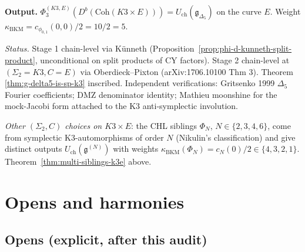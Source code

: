 \documentclass[11pt]{article}
\theoremstyle{definition}
\providecommand{\Coh}{\mathrm{Coh}}
\providecommand{\kBKM}{\kappa_{\mathrm{BKM}}}
\begin{document}
\textbf{Output.} $\Phi_3^{(K3, E)}(D^b(\Coh(K3 \times E))) = U_{\mathrm{ch}}(\mathfrak{g}_{\Delta_5})$
on the curve $E$. Weight $\kBKM = c_{\phi_{0,1}}(0, 0)/2 = 10/2 = 5$.

\smallskip\noindent\emph{Status.} Stage 1 chain-level via K\"unneth
(Proposition~\ref{prop:phi-d-kunneth-split-product}, unconditional on
split products of CY factors).  Stage 2 chain-level at
$(\Sigma_2 = K3, C = E)$ via Oberdieck--Pixton
(arXiv:1706.10100 Thm 3). Theorem
\ref{thm:g-delta5-is-sp-k3} inscribed. Independent verifications:
Gritsenko 1999 $\Delta_5$ Fourier coefficients; DMZ denominator
identity; Mathieu moonshine for the mock-Jacobi form attached to the
K3 anti-symplectic involution.

\emph{Other $(\Sigma_2, C)$ choices on $K3 \times E$}: the CHL
siblings $\Phi_N$, $N \in \{2, 3, 4, 6\}$, come from symplectic
K3-automorphisms of order $N$ (Nikulin's classification) and give
distinct outputs
$U_{\mathrm{ch}}(\mathfrak{g}^{(N)})$ with weights
$\kBKM(\Phi_N) = c_N(0)/2 \in \{4, 3, 2, 1\}$.
Theorem~\ref{thm:multi-siblings-k3e} above.

\section*{Opens and harmonies}

\subsection*{Opens (explicit, after this audit)}
\end{document}
